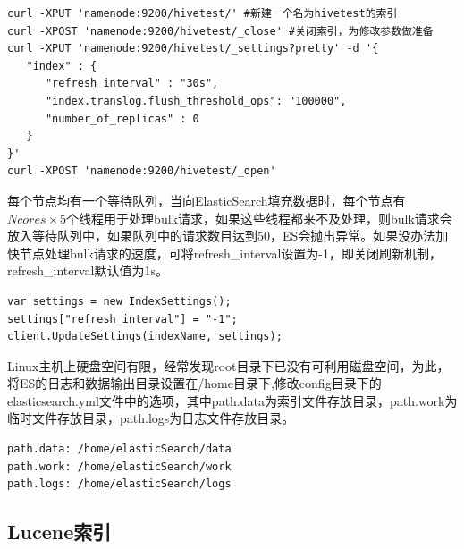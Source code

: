 \begin{verbatim}
curl -XPUT 'namenode:9200/hivetest/' #新建一个名为hivetest的索引
curl -XPOST 'namenode:9200/hivetest/_close' #关闭索引，为修改参数做准备
curl -XPUT 'namenode:9200/hivetest/_settings?pretty' -d '{
   "index" : {
      "refresh_interval" : "30s",
      "index.translog.flush_threshold_ops": "100000",
      "number_of_replicas" : 0
   }
}'
curl -XPOST 'namenode:9200/hivetest/_open'
\end{verbatim}
\par 每个节点均有一个等待队列，当向ElasticSearch填充数据时，每个节点有$Ncores\times 5$个线程用于处理bulk请求，如果这些线程都来不及处理，则bulk请求会放入等待队列中，如果队列中的请求数目达到50，ES会抛出异常。如果没办法加快节点处理bulk请求的速度，可将refresh\_interval设置为-1，即关闭刷新机制，refresh\_interval默认值为1s。
\begin{verbatim}
var settings = new IndexSettings();
settings["refresh_interval"] = "-1";
client.UpdateSettings(indexName, settings);
\end{verbatim}
\par Linux主机上硬盘空间有限，经常发现root目录下已没有可利用磁盘空间，为此，将ES的日志和数据输出目录设置在/home目录下,修改config目录下的elasticsearch.yml文件中的选项，其中path.data为索引文件存放目录，path.work为临时文件存放目录，path.logs为日志文件存放目录。
\begin{verbatim}
path.data: /home/elasticSearch/data
path.work: /home/elasticSearch/work
path.logs: /home/elasticSearch/logs
\end{verbatim}
\subsection{Lucene索引}
